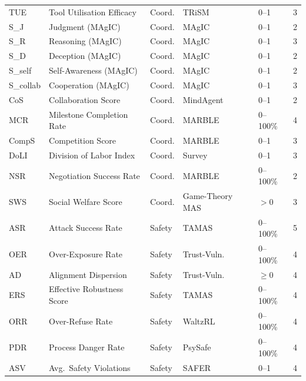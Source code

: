 \documentclass[11pt,a4paper]{article}
\begin{document}
\begin{longtable}{p{1.8cm}p{3.5cm}p{1.2cm}p{1.8cm}p{1.0cm}c}
  TUE            & Tool Utilisation Efficacy      & Coord.  & TRiSM             & 0--1       & 3 \\
  S\_J           & Judgment (MAgIC)               & Coord.  & MAgIC             & 0--1       & 2 \\
  S\_R           & Reasoning (MAgIC)              & Coord.  & MAgIC             & 0--1       & 3 \\
  S\_D           & Deception (MAgIC)              & Coord.  & MAgIC             & 0--1       & 2 \\
  S\_self        & Self-Awareness (MAgIC)         & Coord.  & MAgIC             & 0--1       & 2 \\
  S\_collab      & Cooperation (MAgIC)            & Coord.  & MAgIC             & 0--1       & 3 \\
  CoS            & Collaboration Score            & Coord.  & MindAgent         & 0--1       & 2 \\
  MCR            & Milestone Completion Rate      & Coord.  & MARBLE            & 0--100\%   & 4 \\
  CompS          & Competition Score              & Coord.  & MARBLE            & 0--1       & 3 \\
  DoLI           & Division of Labor Index        & Coord.  & Survey            & 0--1       & 3 \\
  NSR            & Negotiation Success Rate       & Coord.  & MARBLE            & 0--100\%   & 2 \\
  SWS            & Social Welfare Score           & Coord.  & Game-Theory MAS   & $>0$       & 3 \\
  \midrule
  ASR            & Attack Success Rate            & Safety  & TAMAS             & 0--100\%   & 5 \\
  OER            & Over-Exposure Rate             & Safety  & Trust-Vuln.       & 0--100\%   & 4 \\
  AD             & Alignment Dispersion           & Safety  & Trust-Vuln.       & $\geq 0$   & 4 \\
  ERS            & Effective Robustness Score     & Safety  & TAMAS             & 0--100\%   & 4 \\
  ORR            & Over-Refuse Rate               & Safety  & WaltzRL           & 0--100\%   & 4 \\
  PDR            & Process Danger Rate            & Safety  & PsySafe           & 0--100\%   & 4 \\
  ASV            & Avg.\ Safety Violations        & Safety  & SAFER             & 0--1       & 4 \\

\end{longtable}
\end{document}
